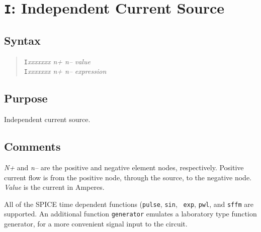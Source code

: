 \section{{\tt I}: Independent Current Source}
\subsection{Syntax}
\begin{verse}
{\tt I}{\it xxxxxxx n+ n--} {\it value}\\
{\tt I}{\it xxxxxxx n+ n--} {\it expression}
\end{verse}
\subsection{Purpose}

Independent current source.
\subsection{Comments}

{\it N+} and {\it n--} are the positive and negative element nodes,
respectively.  Positive current flow is from the positive node, through the
source, to the negative node.  {\it Value} is the current in Amperes.

All of the SPICE time dependent functions ({\tt pulse}, {\tt sin}, {\tt
exp}, {\tt pwl}, and {\tt sffm} are supported.  An additional
function {\tt generator} emulates a laboratory type function generator, for
a more convenient signal input to the circuit.

